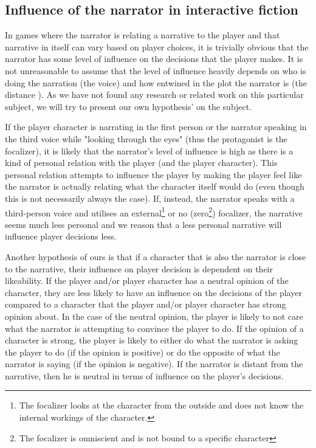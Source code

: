 \subsection{Influence of the narrator in interactive fiction}
In games where the narrator is relating a narrative to the player and that narrative in itself can vary based on player choices, it is trivially obvious that the narrator has some level of influence on the decisions that the player makes. It is not unreasonable to assume that the level of influence heavily depends on who is doing the narration (the voice\cite[p. 70]{Abbot}) and how entwined in the plot the narrator is (the distance \cite[p. 74]{Abbot}). As we have not found any research or related work on this particular subject, we will try to present our own hypothesis' on the subject.

If the player character is narrating in the first person or the narrator speaking in the third voice while "looking through the eyes" (thus the protagonist is the focalizer\cite[p. 73]{Abbot}), it is likely that the narrator's level of influence is high as there is a kind of personal relation with the player (and the player character). This personal relation attempts to influence the player by making the player feel like the narrator is actually relating what the character itself would do (even though this is not necessarily always the case). If, instead, the narrator speaks with a third-person voice and utilises an external\footnote{The focalizer looks at the character from the outside and does not know the internal workings of the character.} or no (zero\footnote{The focalizer is omniscient and is not bound to a specific character}) focalizer, the narrative seems much less personal and we reason that a less personal narrative will influence player decisions less.

Another hypothesis of ours is that if a character that is also the narrator is close to the narrative, their influence on player decision is dependent on their likeability. If the player and/or player character has a neutral opinion of the character, they are less likely to have an influence on the decisions of the player compared to a character that the player and/or player character has strong opinion about. In the case of the neutral opinion, the player is likely to not care what the narrator is attempting to convince the player to do. If the opinion of a character is strong, the player is likely to either do what the narrator is asking the player to do (if the opinion is positive) or do the opposite of what the narrator is saying (if the opinion is negative). If the narrator is distant from the narrative, then he is neutral in terms of influence on the player's decisions.